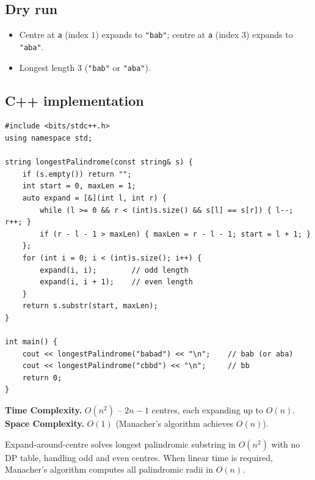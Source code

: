 \subsection*{Dry run}


\begin{itemize}
  \item Centre at \texttt{a} (index $1$) expands to \texttt{"bab"}; centre
        at \texttt{a} (index $3$) expands to \texttt{"aba"}.
  \item Longest length $3$ (\texttt{"bab"} or \texttt{"aba"}).
\end{itemize}

\subsection*{C++ implementation}

\begin{lstlisting}
#include <bits/stdc++.h>
using namespace std;

string longestPalindrome(const string& s) {
    if (s.empty()) return "";
    int start = 0, maxLen = 1;
    auto expand = [&](int l, int r) {
        while (l >= 0 && r < (int)s.size() && s[l] == s[r]) { l--; r++; }
        if (r - l - 1 > maxLen) { maxLen = r - l - 1; start = l + 1; }
    };
    for (int i = 0; i < (int)s.size(); i++) {
        expand(i, i);        // odd length
        expand(i, i + 1);    // even length
    }
    return s.substr(start, maxLen);
}

int main() {
    cout << longestPalindrome("babad") << "\n";    // bab (or aba)
    cout << longestPalindrome("cbbd") << "\n";     // bb
    return 0;
}
\end{lstlisting}

\begin{complexitybox}
\textbf{Time Complexity.} $O(n^2)$ -- $2n-1$ centres, each expanding up to
$O(n)$. \textbf{Space Complexity.} $O(1)$ (Manacher's algorithm achieves
$O(n)$).
\end{complexitybox}

\begin{takeawaybox}
Expand-around-centre solves longest palindromic substring in $O(n^2)$ with
no DP table, handling odd and even centres. When linear time is required,
Manacher's algorithm computes all palindromic radii in $O(n)$.
\end{takeawaybox}
